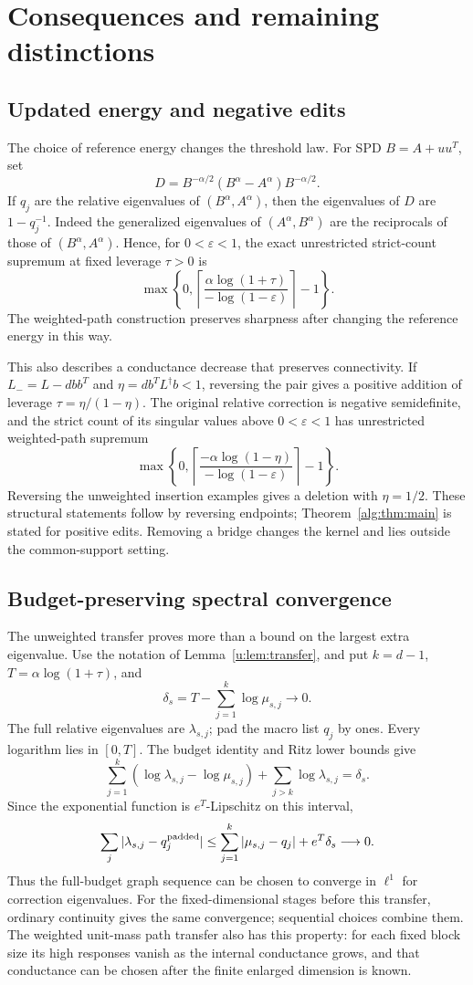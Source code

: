 \section{Consequences and remaining distinctions}\label{sec:consequences}
\subsection{Updated energy and negative edits}
The choice of reference energy changes the threshold law. For SPD
$B=A+uu^T$, set
\[
 D=B^{-\alpha/2}(B^\alpha-A^\alpha)B^{-\alpha/2}.
\]
If $q_j$ are the relative eigenvalues of $(B^\alpha,A^\alpha)$,
then the eigenvalues of $D$ are $1-q_j^{-1}$. Indeed the generalized
eigenvalues of $(A^\alpha,B^\alpha)$ are the reciprocals of those
of $(B^\alpha,A^\alpha)$. Hence, for $0<\varepsilon<1$, the exact
unrestricted strict-count supremum at fixed leverage $\tau>0$ is
\[
 \max\left\{0,\left\lceil
 \frac{\alpha\log(1+\tau)}{-\log(1-\varepsilon)}
 \right\rceil-1\right\}.
\]
The weighted-path construction preserves sharpness after changing the
reference energy in this way.

This also describes a conductance decrease that preserves connectivity.
If $L_-=L-dbb^T$ and $\eta=db^TL^\dagger b<1$, reversing the pair
gives a positive addition of leverage $\tau=\eta/(1-\eta)$.
The original relative correction is negative semidefinite, and the
strict count of its singular values above $0<\varepsilon<1$ has
unrestricted weighted-path supremum
\[
 \max\left\{0,\left\lceil
 \frac{-\alpha\log(1-\eta)}{-\log(1-\varepsilon)}
 \right\rceil-1\right\}.
\]
Reversing the unweighted insertion examples gives a deletion with
$\eta=1/2$. These structural statements follow by reversing endpoints;
Theorem~\ref{alg:thm:main} is stated for positive edits. Removing a bridge
changes the kernel and lies outside the common-support setting.

\subsection{Budget-preserving spectral convergence}
The unweighted transfer proves more than a bound on the largest extra
eigenvalue. Use the notation of Lemma~\ref{u:lem:transfer}, and put
$k=d-1$, $T=\alpha\log(1+\tau)$, and
\[
 \delta_s=T-\sum_{j=1}^k\log\mu_{s,j}\longrightarrow0.
\]
The full relative eigenvalues are $\lambda_{s,j}$; pad the macro list
$q_j$ by ones. Every logarithm lies in $[0,T]$. The budget identity and
Ritz lower bounds give
\[
 \sum_{j=1}^k(\log\lambda_{s,j}-\log\mu_{s,j})
       +\sum_{j>k}\log\lambda_{s,j}=\delta_s.
\]
Since the exponential function is $e^T$-Lipschitz on this interval,
\[
 \sum_j|\lambda_{s,j}-q_j^{\rm padded}|
 \le\sum_{j=1}^k|\mu_{s,j}-q_j|+e^T\delta_s\longrightarrow0.
\]
Thus the full-budget graph sequence can be chosen to converge in
$\ell^1$ for correction eigenvalues. For the fixed-dimensional stages
before this transfer, ordinary continuity gives the same convergence;
sequential choices combine them. The weighted unit-mass path transfer
also has this property: for each fixed block size its high responses
vanish as the internal conductance grows, and that conductance can be
chosen after the finite enlarged dimension is known.

